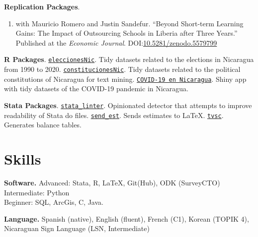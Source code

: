 \documentclass[a4paper, 10pt]{article}
\renewenvironment{itemize}{
  \begin{list}{}
    { \setlength{\itemsep}{5pt}
      \setlength{\parsep}{0pt}
      \setlength{\topsep}{0pt}
      \setlength{\leftmargin}{0em} } }{
  \end{list}}
\begin{document}
\begin{itemize}
  \item \textbf{Replication Packages}.
  \begin{enumerate}[leftmargin=10pt, label={}, itemindent=-10pt, nosep]
    \item with Mauricio Romero and Justin Sandefur. ``Beyond Short-term Learning Gains: The Impact of Outsourcing Schools in Liberia after Three Years.'' Published at the \textit{Economic Journal}. DOI:\href{https://doi.org/10.5281/zenodo.5579799}{10.5281/zenodo.5579799}
  \end{enumerate}
  \item \textbf{R Packages}. \newline \texttt{\href{https://github.com/RRMaximiliano/eleccionesNic}{eleccionesNic}}. Tidy datasets related to the elections in Nicaragua from 1990 to 2020. \newline \texttt{\href{https://github.com/RRMaximiliano/constitucionesNic}{constitucionesNic}}. Tidy datasets related to the political constitutions of Nicaragua for text mining. \newline \texttt{\href{https://rrmaximiliano.shinyapps.io/covid-nicaragua/}{COVID-19 en Nicaragua}}. Shiny app with tidy datasets of the COVID-19 pandemic in Nicaragua.
  \item \textbf{Stata Packages}. \newline \texttt{\href{https://github.com/worldbank/stata-linter}{stata\_linter}}. Opinionated detector that attempts to improve readability of Stata do files. \newline \texttt{\href{https://github.com/RRMaximiliano/send\_est}{send\_est}}. Sends estimates to \LaTeX. \newline \texttt{\href{https://github.com/RRMaximiliano/tvsc}{tvsc}}. Generates balance tables.
\end{itemize}


\section*{Skills}
\begin{itemize}
\item \textbf{Software.} \newline Advanced: Stata, R, \LaTeX, Git(Hub), ODK (SurveyCTO) \\
Intermediate: Python \\
Beginner: SQL, ArcGis, C, Java.
\item \textbf{Language.} \newline Spanish (native), English (fluent), French (C1), Korean (TOPIK 4), Nicaraguan Sign Language (LSN, Intermediate)
\end{itemize}
\bigskip
\end{document}
